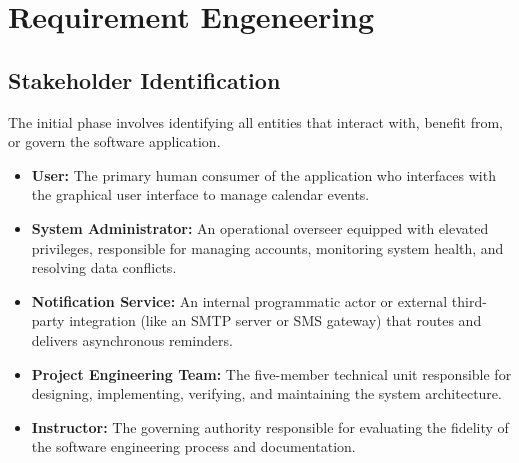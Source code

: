 \section{Requirement Engeneering}
\subsection{Stakeholder Identification}
The initial phase involves identifying all entities that interact with, benefit from, or govern the software application.

\begin{itemize}[leftmargin=*]
    \item \textbf{User:} The primary human consumer of the application who interfaces with the graphical user interface to manage calendar events.

    \item \textbf{System Administrator:} An operational overseer equipped with elevated privileges, responsible for managing accounts, monitoring system health, and resolving data conflicts.

    \item \textbf{Notification Service:} An internal programmatic actor or external third-party integration (like an SMTP server or SMS gateway) that routes and delivers asynchronous reminders.

    \item \textbf{Project Engineering Team:} The five-member technical unit responsible for designing, implementing, verifying, and maintaining the system architecture.

    \item \textbf{Instructor:} The governing authority responsible for evaluating the fidelity of the software engineering process and documentation.
\end{itemize}
